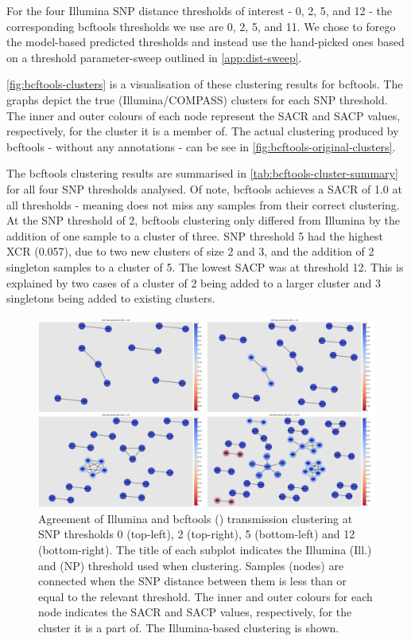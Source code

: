 For the four Illumina SNP distance thresholds of interest - 0, 2, 5, and 12 - the corresponding bcftools thresholds we use are 0, 2, 5, and 11. We chose to forego the model-based predicted thresholds and instead use the hand-picked ones based on a threshold parameter-sweep outlined in \autoref{app:dist-sweep}.

\autoref{fig:bcftools-clusters} is a visualisation of these clustering results for bcftools. The graphs depict the true (Illumina/COMPASS) clusters for each SNP threshold. The inner and outer colours of each node represent the SACR and SACP values, respectively, for the cluster it is a member of. The actual clustering produced by bcftools - without any annotations - can be see in \autoref{fig:bcftools-original-clusters}.

The bcftools clustering results are summarised in \autoref{tab:bcftools-cluster-summary} for all four SNP thresholds analysed. Of note, bcftools achieves a SACR of 1.0 at all thresholds - meaning \ont{} does not miss any samples from their correct clustering. At the SNP threshold of 2, bcftools clustering only differed from Illumina by the addition of one sample to a cluster of three.  SNP threshold 5 had the highest XCR (0.057), due to two new clusters of size 2 and 3, and the addition of 2 singleton samples to a cluster of 5.  The lowest SACP was at threshold 12. This is explained by two cases of a cluster of 2 being added to a larger cluster and 3 singletons being added to existing clusters. 

\begin{figure}
\begin{center}
\includegraphics[width=0.90\columnwidth]{Chapter2/Figs/bcftools_clusters.png}
\caption{{Agreement of Illumina and bcftools (\ont{}) transmission clustering at SNP thresholds 0 (top-left), 2 (top-right), 5 (bottom-left) and 12 (bottom-right). The title of each subplot indicates the Illumina (Ill.) and \ont{} (NP) threshold used when clustering. Samples (nodes) are connected when the SNP distance between them is less than or equal to the relevant threshold. The inner and outer colours for each node indicates the SACR and SACP values, respectively, for the cluster it is a part of. The Illumina-based clustering is shown.
{\label{fig:bcftools-clusters}}
}}
\end{center}
\end{figure}


